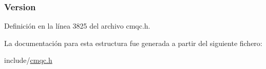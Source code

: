 \subsubsection[{Version}]{ Version}\label{structtag_m_q_c_b_d_a0656ef8f766b3907d394d88a35d7b7e9}


Definición en la línea 3825 del archivo cmqc.\+h.



La documentación para esta estructura fue generada a partir del siguiente fichero\+:\begin{DoxyCompactItemize}
\item 
include/\hyperlink{cmqc_8h}{cmqc.\+h}\end{DoxyCompactItemize}
